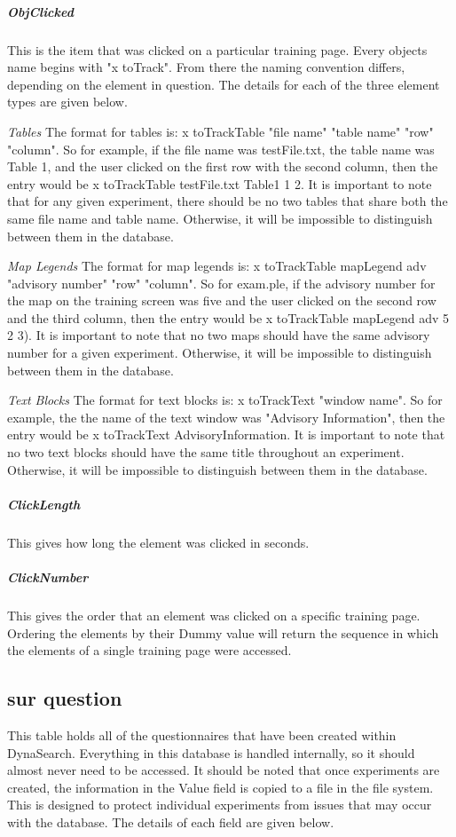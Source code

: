 \documentclass[article]{ij4uq}              %
\begin{document}
\subparagraph{ObjClicked}
This is the item that was clicked on a particular training page. Every objects name begins with "x toTrack". From there the naming convention differs, depending on the element in question. The details for each of the three element types are given below.
 
\emph{Tables}
The format for tables is: x toTrackTable "file name" "table name" "row" "column". So for example, if the file name was testFile.txt, the table name was Table 1, and the user clicked on the first row with the second column, then the entry would be x toTrackTable testFile.txt Table1 1 2. 
It is important to note that for any given experiment, there should be no two tables that share both the same file name and table name. Otherwise, it will be impossible to distinguish between them in the database.

\emph{Map Legends}
The format for map legends is: x toTrackTable mapLegend adv "advisory number" "row" "column". So for exam.ple, if the advisory number for the map on the training screen was five and the user clicked on the second row and the third column, then the entry would be x toTrackTable mapLegend adv 5 2 3). 
It is important to note that no two maps should have the same advisory number for a given experiment. Otherwise, it will be impossible to distinguish between them in the database.

\emph{Text Blocks}
The format for text blocks is: x toTrackText "window name". So for example, the the name of the text window was "Advisory Information", then the entry would be x toTrackText AdvisoryInformation. 
It is important to note that no two text blocks should have the same title throughout an experiment. Otherwise, it will be impossible to distinguish between them in the database.

\subparagraph{ClickLength}
This gives how long the element was clicked in seconds.

\subparagraph{ClickNumber}
This gives the order that an element was clicked on a specific training page. Ordering the elements by their Dummy value will return the sequence in which the elements of a single training page were accessed.

\subsection{sur question}
This table holds all of the questionnaires that have been created within DynaSearch. Everything in this database is handled internally, so it should almost never need to be accessed. It should be noted that once experiments are created, the information in the Value field is copied to a file in the file system. This is designed to protect individual experiments from issues that may occur with the database. The details of each field are given below.
\end{document}

